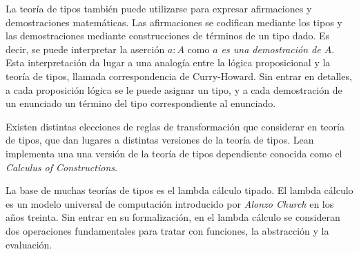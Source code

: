 
La teoría de tipos también puede utilizarse para expresar afirmaciones y
demostraciones matemáticas. Las afirmaciones se codifican mediante los tipos y
las demostraciones mediante construcciones de términos de un tipo dado. Es
decir, se puede interpretar la aserción $a : A$ como \textit{$a$ es una
	demostración de $A$}. Esta interpretación da lugar a una analogía entre la
lógica proposicional y la teoría de tipos, llamada correspondencia de
Curry-Howard. Sin entrar en detalles, a cada proposición lógica se le puede
asignar un tipo, y a cada demostración de un enunciado un término del tipo
correspondiente al enunciado.


Existen distintas elecciones de reglas de transformación que considerar en
teoría de tipos, que dan lugares a distintas versiones de la teoría de tipos.
Lean implementa una una versión de la teoría de tipos dependiente conocida como
el \textit{Calculus of Constructions}.

La base de muchas teorías de tipos es el lambda cálculo tipado. El lambda
cálculo es un modelo universal de computación introducido por \textit{Alonzo
	Church} en los años treinta. Sin entrar en su formalización, en el lambda
cálculo se consideran dos operaciones fundamentales para tratar con funciones,
la abstracción y la evaluación.

